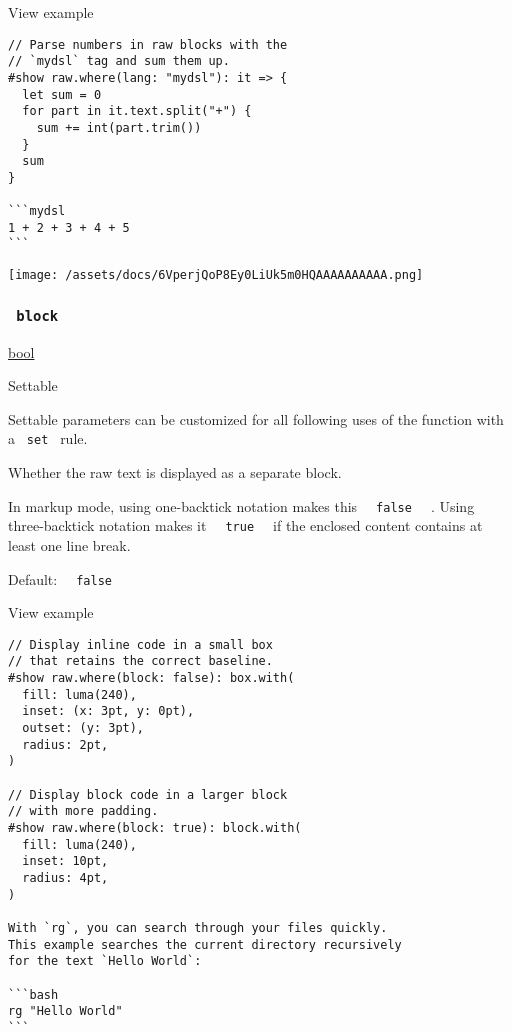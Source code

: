 
View example

\begin{verbatim}
// Parse numbers in raw blocks with the
// `mydsl` tag and sum them up.
#show raw.where(lang: "mydsl"): it => {
  let sum = 0
  for part in it.text.split("+") {
    sum += int(part.trim())
  }
  sum
}

```mydsl
1 + 2 + 3 + 4 + 5
```
\end{verbatim}

\texttt{[image: /assets/docs/6VperjQoP8Ey0LiUk5m0HQAAAAAAAAAA.png]}

\subsubsection{\texorpdfstring{\texttt{\ block\ }}{ block }}\label{parameters-block}

\href{/docs/reference/foundations/bool/}{bool}

{{ Settable }}

\label{parameters-block-settable-tooltip}
Settable parameters can be customized for all following uses of the
function with a \texttt{\ set\ } rule.

Whether the raw text is displayed as a separate block.

In markup mode, using one-backtick notation makes this
\texttt{\ }{\texttt{\ false\ }}\texttt{\ } . Using three-backtick
notation makes it \texttt{\ }{\texttt{\ true\ }}\texttt{\ } if the
enclosed content contains at least one line break.

Default: \texttt{\ }{\texttt{\ false\ }}\texttt{\ }


View example

\begin{verbatim}
// Display inline code in a small box
// that retains the correct baseline.
#show raw.where(block: false): box.with(
  fill: luma(240),
  inset: (x: 3pt, y: 0pt),
  outset: (y: 3pt),
  radius: 2pt,
)

// Display block code in a larger block
// with more padding.
#show raw.where(block: true): block.with(
  fill: luma(240),
  inset: 10pt,
  radius: 4pt,
)

With `rg`, you can search through your files quickly.
This example searches the current directory recursively
for the text `Hello World`:

```bash
rg "Hello World"
```
\end{verbatim}

